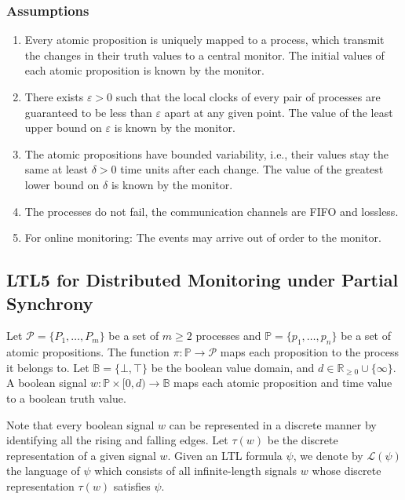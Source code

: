\documentclass[envcountsame, runningheads]{llncs}
\title{}
\author{} %
\institute{} %
\date{}
\newcommand{\rednote}[2][]{{\todo[color=magenta!80,size=\footnotesize,#1]{\normalcolor\normalfont#2}}}
\newcommand{\R}{\mathbb{R}}
\newcommand{\B}{\mathbb{B}}
\newcommand{\?}{\text{?}}
\begin{document}
	\maketitle

	\subsubsection*{Assumptions}
	\begin{enumerate}
		\item Every atomic proposition is uniquely mapped to a process, which transmit the changes in their truth values to a central monitor. The initial values of each atomic proposition is known by the monitor.
		\item There exists $\varepsilon > 0$ such that the local clocks of every pair of processes are guaranteed to be less than $\varepsilon$ apart at any given point. The value of the least upper bound on $\varepsilon$ is known by the monitor. 
		\item The atomic propositions have bounded variability, i.e., their values stay the same at least $\delta > 0$ time units after each change. The value of the greatest lower bound on $\delta$ is known by the monitor. 
		\item The processes do not fail, the communication channels are FIFO and lossless.
		\item For online monitoring: The events may arrive out of order to the monitor. \rednote{Not taken into account yet.}
	\end{enumerate}
	
	\subsection*{LTL5 for Distributed Monitoring under Partial Synchrony}
	Let $\mathcal{P} = \{P_1, \ldots, P_m\}$ be a set of $m \geq 2$ processes and $\mathbb{P} = \{p_1, \ldots, p_n\}$ be a set of atomic propositions.
	The function $\pi : \mathbb{P} \to \mathcal{P}$ maps each proposition to the process it belongs to.
	Let $\B = \{\bot, \top\}$ be the boolean value domain, and $d \in \R_{\geq 0} \cup \{\infty\}$.
	A boolean signal $w : \mathbb{P} \times [0,d) \to \B$ maps each atomic proposition and time value to a boolean truth value.

	Note that every boolean signal $w$ can be represented in a discrete manner by identifying all the rising and falling edges.
	Let $\tau(w)$ be the discrete representation of a given signal $w$.
	Given an LTL formula $\psi$, we denote by $\mathcal{L}(\psi)$ the language of $\psi$ which consists of all infinite-length signals $w$ whose discrete representation $\tau(w)$ satisfies $\psi$.
	
\end{document}
